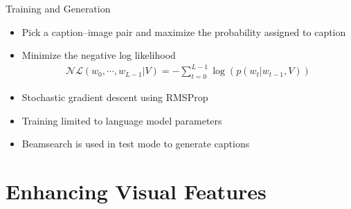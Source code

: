 \documentclass{beamer}
\begin{document}
\begin{frame}{Training and Generation}
    \begin{itemize}
        \item Pick a caption--image pair and maximize the probability assigned to caption 
        \item Minimize the negative log likelihood 
            \begin{align*}
              \mathcal{NL}(w_0,\cdots, w_{L-1} | V) = -\sum_{t=0}^{L-1} \log(p(w_t|w_{t-1},V))
            \end{align*}
        \item Stochastic gradient descent using RMSProp 
        \item Training limited to language model parameters 
        \item Beamsearch is used in test mode to generate captions 
    \end{itemize}
\end{frame}
\section{Enhancing Visual Features}
\end{document}
